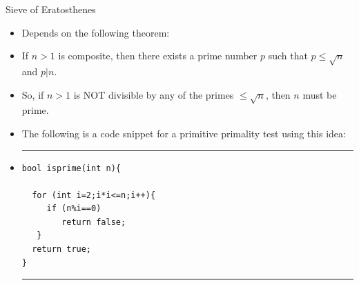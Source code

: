 \documentclass[ %
 usenames,dvipsnames,
aspectratio=169,11pt ]{beamer}
\newenvironment{stepitemize}{\begin{itemize}[<+->]}{\end{itemize} }
\begin{document}
\begin{frame}[fragile]{Sieve of Eratosthenes}
\begin{stepitemize}
\item Depends on the following theorem:
\item If $n>1$ is composite, then there exists a prime number $p$ such that $p\leq \sqrt{n}$ and $p|n$.
\item So, if $n>1$ is NOT divisible by any of the primes $\leq \sqrt{n}$, then $n$ must be prime.
\item The following is a code snippet for a primitive primality test using this idea:

\item[] \rule{\textwidth}{1pt}
\begin{verbatim}
bool isprime(int n){

  for (int i=2;i*i<=n;i++){
     if (n%i==0)
        return false;
   }
  return true;
}
\end{verbatim}
\rule{\textwidth}{1pt}
\end{stepitemize}

\end{frame}
\end{document}
